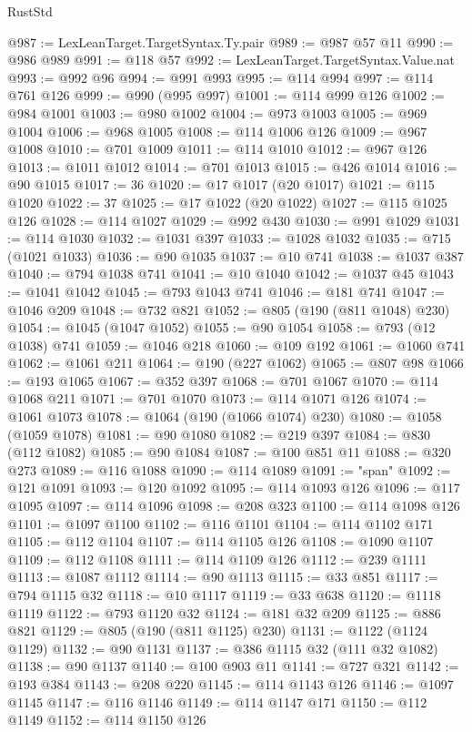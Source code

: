 \begin{lexlean}{RustStd}
\begin{coremodule}
{\begin{coremodule}
{{{{{{{{{{{{{{{{{{{{{{{{{{{{{{{{{{{{{{{{{{{{{{{{{{@987 := LexLeanTarget.TargetSyntax.Ty.pair
@989 := @987 @57 @11
@990 := @986 @989
@991 := @118 @57
@992 := LexLeanTarget.TargetSyntax.Value.nat
@993 := @992 @96
@994 := @991 @993
@995 := @114 @994
@997 := @114 @761 @126
@999 := @990 (@995 @997)
@1001 := @114 @999 @126
@1002 := @984 @1001
@1003 := @980 @1002
@1004 := @973 @1003
@1005 := @969 @1004
@1006 := @968 @1005
@1008 := @114 @1006 @126
@1009 := @967 @1008
@1010 := @701 @1009
@1011 := @114 @1010
@1012 := @967 @126
@1013 := @1011 @1012
@1014 := @701 @1013
@1015 := @426 @1014
@1016 := @90 @1015
@1017 := 36
@1020 := @17 @1017 (@20 @1017)
@1021 := @115 @1020
@1022 := 37
@1025 := @17 @1022 (@20 @1022)
@1027 := @115 @1025 @126
@1028 := @114 @1027
@1029 := @992 @430
@1030 := @991 @1029
@1031 := @114 @1030
@1032 := @1031 @397
@1033 := @1028 @1032
@1035 := @715 (@1021 @1033)
@1036 := @90 @1035
@1037 := @10 @741
@1038 := @1037 @387
@1040 := @794 @1038 @741
@1041 := @10 @1040
@1042 := @1037 @45
@1043 := @1041 @1042
@1045 := @793 @1043 @741
@1046 := @181 @741
@1047 := @1046 @209
@1048 := @732 @821
@1052 := @805 (@190 (@811 @1048) @230)
@1054 := @1045 (@1047 @1052)
@1055 := @90 @1054
@1058 := @793 (@12 @1038) @741
@1059 := @1046 @218
@1060 := @109 @192
@1061 := @1060 @741
@1062 := @1061 @211
@1064 := @190 (@227 @1062)
@1065 := @807 @98
@1066 := @193 @1065
@1067 := @352 @397
@1068 := @701 @1067
@1070 := @114 @1068 @211
@1071 := @701 @1070
@1073 := @114 @1071 @126
@1074 := @1061 @1073
@1078 := @1064 (@190 (@1066 @1074) @230)
@1080 := @1058 (@1059 @1078)
@1081 := @90 @1080
@1082 := @219 @397
@1084 := @830 (@112 @1082)
@1085 := @90 @1084
@1087 := @100 @851 @11
@1088 := @320 @273
@1089 := @116 @1088
@1090 := @114 @1089
@1091 := "span"
@1092 := @121 @1091
@1093 := @120 @1092
@1095 := @114 @1093 @126
@1096 := @117 @1095
@1097 := @114 @1096
@1098 := @208 @323
@1100 := @114 @1098 @126
@1101 := @1097 @1100
@1102 := @116 @1101
@1104 := @114 @1102 @171
@1105 := @112 @1104
@1107 := @114 @1105 @126
@1108 := @1090 @1107
@1109 := @112 @1108
@1111 := @114 @1109 @126
@1112 := @239 @1111
@1113 := @1087 @1112
@1114 := @90 @1113
@1115 := @33 @851
@1117 := @794 @1115 @32
@1118 := @10 @1117
@1119 := @33 @638
@1120 := @1118 @1119
@1122 := @793 @1120 @32
@1124 := @181 @32 @209
@1125 := @886 @821
@1129 := @805 (@190 (@811 @1125) @230)
@1131 := @1122 (@1124 @1129)
@1132 := @90 @1131
@1137 := @386 @1115 @32 (@111 @32 @1082)
@1138 := @90 @1137
@1140 := @100 @903 @11
@1141 := @727 @321
@1142 := @193 @384
@1143 := @208 @220
@1145 := @114 @1143 @126
@1146 := @1097 @1145
@1147 := @116 @1146
@1149 := @114 @1147 @171
@1150 := @112 @1149
@1152 := @114 @1150 @126
}}}}}}}}}}}}}}}}}}}}}}}}}}}}}}}}}}}}}}}}}}}}}}}}}}
\end{coremodule}}
\end{coremodule}
\end{lexlean}
